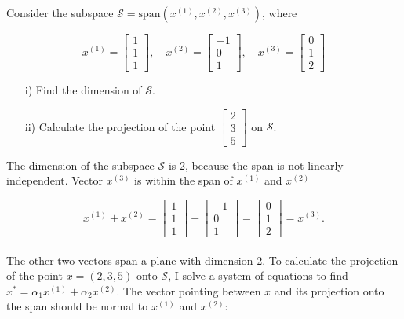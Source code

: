 \begin{homeworkProblem}

Consider the subspace $\mathcal S=\text{span} (x^{(1)},x^{(2)},x^{(3)})$, where

\begin{equation}
    x^{(1)}=\left[\begin{array}{c} 1\\ 1 \\ 1\end{array} \right], \quad 
    x^{(2)}=\left[\begin{array}{c} -1\\ 0 \\ 1\end{array} \right], \quad 
    x^{(3)}=\left[\begin{array}{c} 0\\ 1 \\ 2\end{array} \right]
\end{equation}

\begin{itemize}
    \item [i)] Find the dimension of $\mathcal S$.
    \item [ii)] Calculate the projection of the point $\left[\begin{array}{c} 2\\ 3 \\ 5\end{array} \right]$ on $\mathcal S$.
\end{itemize}

\begin{solution}
    The dimension of the subspace $\mathcal{S}$ is 2, because the span 
    is not linearly independent. Vector $x^{(3)}$ is within the span of
    $x^{(1)}$ and $x^{(2)}$

    \[
        x^{(1)} + x^{(2)} = 
        \left[\begin{array}{c} 1\\ 1 \\ 1\end{array} \right] +
        \left[\begin{array}{c} -1\\ 0 \\ 1\end{array} \right] =
        \left[\begin{array}{c} 0\\ 1 \\ 2\end{array} \right] = 
        x^{(3)}.
    \]
    \\ 
    The other two vectors span a plane with dimension 2. To calculate the
    projection of the point $x = (2, 3, 5)$ onto $\mathcal{S}$,
    I solve a system of equations to find $x^* = \alpha_1 x^{(1)}
    + \alpha_2 x^{(2)}$. The vector pointing between $x$ and its 
    projection onto the span should be normal to $x^{(1)}$ and $x^{(2)}$:


\end{solution}
\end{homeworkProblem}
